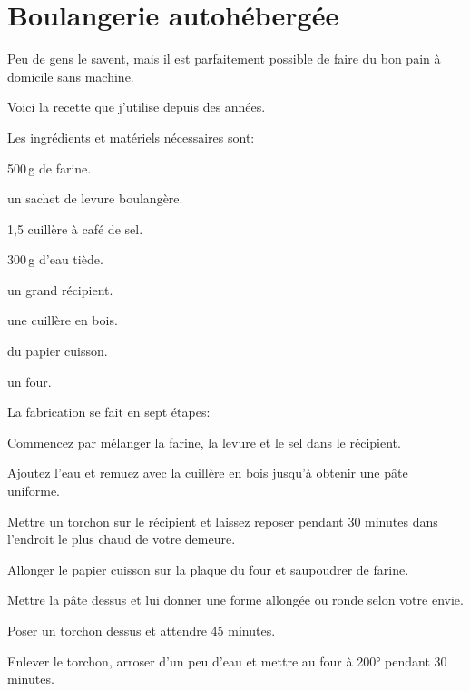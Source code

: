 \section{Boulangerie autohébergée}

Peu de gens le savent, mais il est parfaitement possible de faire du bon pain
à domicile sans machine.

Voici la recette que j'utilise depuis des années.

Les ingrédients et matériels nécessaires sont:

\begin{ingredients}
	\item 500\,g de farine.
	\item un sachet de levure boulangère.
	\item 1,5 cuillère à café de sel.
	\item 300\,g d'eau tiède.
	\item un grand récipient.
	\item une cuillère en bois.
	\item du papier cuisson.
	\item un four.
\end{ingredients}

La fabrication se fait en sept étapes:
\begin{instructions}

	\item Commencez par mélanger la farine, la levure et le sel dans le
	récipient.

	\item Ajoutez l'eau et remuez avec la cuillère en bois jusqu'à obtenir une
	pâte uniforme.

	\item Mettre un torchon sur le récipient et laissez reposer pendant 30
	minutes dans l'endroit le plus chaud de votre demeure.

	\item Allonger le papier cuisson sur la plaque du four et saupoudrer de
	farine.

	\item Mettre la pâte dessus et lui donner une forme allongée ou ronde
	selon votre envie.

	\item Poser un torchon dessus et attendre 45 minutes.

	\item Enlever le torchon, arroser d'un peu d'eau et mettre au four à 200°
	pendant 30 minutes.

\end{instructions}

